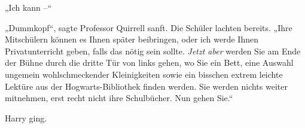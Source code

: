 „Ich kann –“

„Dummkopf“, sagte Professor Quirrell sanft. Die Schüler lachten bereits. „Ihre Mitschülern können es Ihnen später beibringen, oder ich werde Ihnen Privatunterricht geben, falls das nötig sein sollte. \emph{Jetzt aber} werden Sie am Ende der Bühne durch die dritte Tür von links gehen, wo Sie ein Bett, eine Auswahl ungemein wohlschmeckender Kleinigkeiten sowie ein bisschen extrem leichte Lektüre aus der Hogwarts-Bibliothek finden werden. Sie werden nichts weiter mitnehmen, erst recht nicht ihre Schulbücher. Nun gehen Sie.“

Harry ging.

